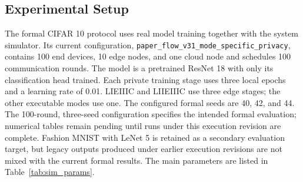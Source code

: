 \documentclass[5p,times]{elsarticle}
\theoremstyle{plain}
\theoremstyle{definition}
\theoremstyle{remark}
\newcommand{\tabref}[1]{Table~\ref{#1}}
\begin{document}
\subsection{Experimental Setup}
\label{sec:exp_setup}
The formal CIFAR 10 protocol uses real model training together with the system
simulator. Its current configuration, \texttt{paper\_flow\_v31\_mode\_specific\_privacy},
contains 100 end devices, 10 edge nodes, and one cloud node and schedules 100
communication rounds. The model is a pretrained ResNet 18 with only its
classification head trained. Each private training stage uses three local epochs
and a learning rate of 0.01. LIEIIIC and LIIEIIIC use three edge stages; the
other executable modes use one. The configured formal seeds are 40, 42, and 44.
The 100-round, three-seed configuration specifies the intended formal evaluation;
numerical tables remain pending until runs under this execution revision are
complete. Fashion MNIST with LeNet 5 is retained as a secondary evaluation target,
but legacy outputs produced under earlier execution revisions are not mixed with
the current formal results. The main parameters are listed in
\tabref{tab:sim_params}.
\end{document}
